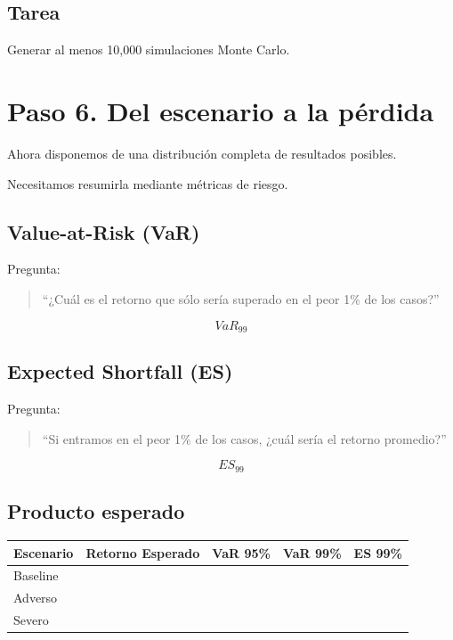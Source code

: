 \documentclass[11pt]{article}
\begin{document}
\subsection*{Tarea}

Generar al menos 10,000 simulaciones Monte Carlo.

\section{Paso 6. Del escenario a la pérdida}

Ahora disponemos de una distribución completa de resultados posibles.

Necesitamos resumirla mediante métricas de riesgo.

\subsection*{Value-at-Risk (VaR)}

Pregunta:

\begin{quote}
``¿Cuál es el retorno que sólo sería superado en el peor 1\% de los casos?''
\end{quote}

\[
VaR_{99}
\]

\subsection*{Expected Shortfall (ES)}

Pregunta:

\begin{quote}
``Si entramos en el peor 1\% de los casos, ¿cuál sería el retorno promedio?''
\end{quote}

\[
ES_{99}
\]

\subsection*{Producto esperado}

\begin{center}
\begin{tabular}{lrrrr}
\toprule
Escenario & Retorno Esperado & VaR 95\% & VaR 99\% & ES 99\% \\
\midrule
Baseline & & & & \\
Adverso & & & & \\
Severo & & & & \\
\bottomrule
\end{tabular}
\end{center}
\end{document}
